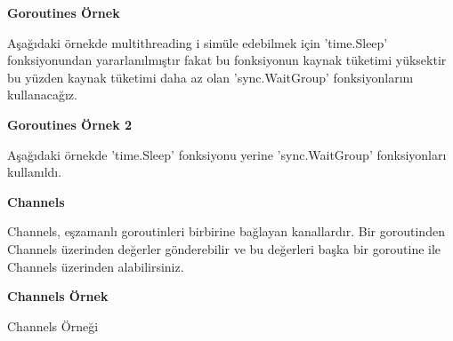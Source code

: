 \vspace{5mm}


\vspace{10mm}

\textbf{Goroutines Örnek}
\vspace{10mm}

Aşağıdaki örnekde multithreading i simüle edebilmek için 'time.Sleep' fonksiyonundan yararlanılmıştır fakat bu fonksiyonun kaynak tüketimi yüksektir bu yüzden kaynak tüketimi daha az olan  'sync.WaitGroup' fonksiyonlarını kullanacağız.

\vspace{10mm}



\vspace{10mm}

\textbf{Goroutines Örnek 2}
\vspace{10mm}

Aşağıdaki örnekde 'time.Sleep' fonksiyonu yerine  'sync.WaitGroup' fonksiyonları kullanıldı.

\vspace{10mm}

\vspace{10mm}

\textbf{Channels}
\vspace{5mm}

Channels, eşzamanlı goroutinleri birbirine bağlayan kanallardır. Bir goroutinden Channels üzerinden değerler gönderebilir ve bu değerleri başka bir goroutine ile Channels üzerinden alabilirsiniz.
\vspace{10mm}



\vspace{10mm}

\textbf{Channels Örnek}

\vspace{10mm}

\caption{Channels Örneği}

\vspace{10mm}

